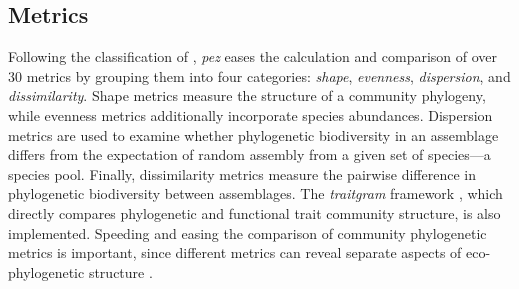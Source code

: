 \documentclass{bioinfo}
\begin{document}
\subsection{Metrics}
Following the classification of \citet{Pearse2014review}, \emph{pez}
eases the calculation and comparison of over 30 metrics by grouping
them into four categories: \emph{shape}, \emph{evenness},
\emph{dispersion}, and \emph{dissimilarity}. Shape metrics measure the
structure of a community phylogeny, while evenness metrics
additionally incorporate species abundances. Dispersion metrics are
used to examine whether phylogenetic biodiversity in an assemblage
differs from the expectation of random assembly from a given set of
species---a species pool. Finally, dissimilarity metrics measure the
pairwise difference in phylogenetic biodiversity between
assemblages. The \emph{traitgram} framework
\citep{Ackerly2009,Cadotte2013}, which directly compares phylogenetic
and functional trait community structure, is also
implemented. Speeding and easing the comparison of community
phylogenetic metrics is important, since different metrics can reveal
separate aspects of eco-phylogenetic structure \citep{Cadotte2010}.
\end{document}
